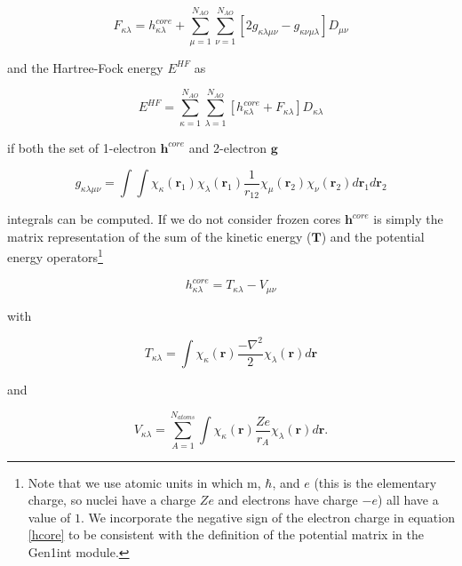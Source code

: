 \documentclass[11pt, bibliography=totoc]{scrartcl}
\begin{document}
\begin{equation} \label{fm}
F_{\kappa \lambda}=h^{core}_{\kappa \lambda}  + \sum_{\mu=1}^{N_{AO}}\sum_{\nu=1}^{N_{AO}} \left[ 2g_{\kappa \lambda \mu \nu} - g_{\kappa \nu \mu \lambda}\right]D_{\mu \nu}
\end{equation}

and the Hartree-Fock energy $E^{HF}$ as

\begin{equation} \label{EHF}
E^{HF}= \sum_{\kappa=1}^{N_{AO}}\sum_{\lambda=1}^{N_{AO}} \left[ h^{core}_{\kappa \lambda}+F_{\kappa \lambda} \right] D_{\kappa \lambda}
\end{equation}

 if both the set of 1-electron $\mathbf{h}^{core}$ and 2-electron $\mathbf{g}$ 
 
 \begin{equation} \label{g} 
 g_{\kappa \lambda \mu \nu}=\int \int \chi_\kappa(\mathbf{r}_1) \chi_\lambda(\mathbf{r}_1) \frac{1}{r_{12}}  \chi_\mu(\mathbf{r}_2) \chi_\nu(\mathbf{r}_2) d\mathbf{r}_1 d\mathbf{r}_2
 \end{equation}
 
 integrals can be computed. If we do not consider frozen cores $\mathbf{h}^{core}$ is simply the matrix representation of the sum of the kinetic energy ($\mathbf{T}$) and the potential energy operators\footnote{Note that we use atomic units in which m, $\hbar$, and $e$ (this is the elementary charge, so nuclei have a charge $Ze$ and electrons have charge $-e$) all have a value of $1$. We incorporate the negative sign of the electron charge in equation \ref{hcore} to be consistent with the definition of the potential matrix in the Gen1int module.}  
 
\begin{equation} \label{hcore}
h^{core}_{\kappa \lambda}=T_{\kappa \lambda} - V_{\mu \nu}
\end{equation}

with 

\begin{equation} \label{kinetic}
T_{\kappa \lambda}= \int \chi_\kappa(\mathbf{r}) \frac{- \nabla^2}{2} \chi_\lambda(\mathbf{r})  d\mathbf{r}
\end{equation}

and 

\begin{equation} \label{potential}
V_{\kappa \lambda} =\sum_{A=1}^{N_{atoms}} \int \chi_\kappa(\mathbf{r}) \frac{Ze}{r_A} \chi_\lambda(\mathbf{r})  d\mathbf{r}.
\end{equation} 
\end{document}

